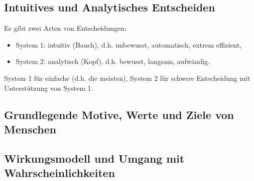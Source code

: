 \subsection{Intuitives und Analytisches Entscheiden}
Es gibt zwei Arten von Entscheidungen:
\begin{itemize}
	\item System 1: intuitiv (Bauch), d.h. unbewusst, automatisch, extrem effizient,
	\item System 2: analytisch (Kopf), d.h. bewusst, langsam, aufwändig.
\end{itemize}
System 1 für einfache (d.h. die meisten), System 2 für schwere Entscheidung mit Unterstützung von System 1.


\subsection{Grundlegende Motive, Werte und Ziele von Menschen}


\subsection{Wirkungsmodell und Umgang mit Wahrscheinlichkeiten}

